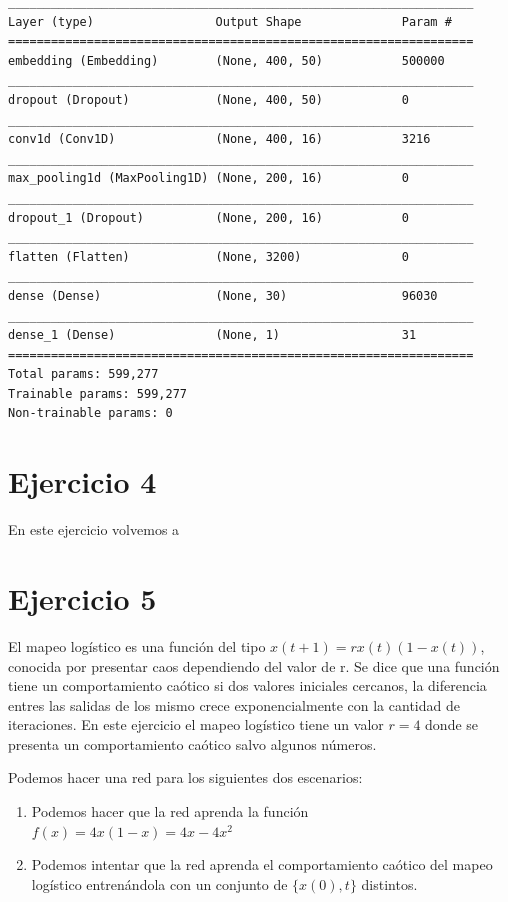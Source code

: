 \begin{verbatim}
_________________________________________________________________
Layer (type)                 Output Shape              Param #   
=================================================================
embedding (Embedding)        (None, 400, 50)           500000    
_________________________________________________________________
dropout (Dropout)            (None, 400, 50)           0         
_________________________________________________________________
conv1d (Conv1D)              (None, 400, 16)           3216      
_________________________________________________________________
max_pooling1d (MaxPooling1D) (None, 200, 16)           0         
_________________________________________________________________
dropout_1 (Dropout)          (None, 200, 16)           0         
_________________________________________________________________
flatten (Flatten)            (None, 3200)              0         
_________________________________________________________________
dense (Dense)                (None, 30)                96030     
_________________________________________________________________
dense_1 (Dense)              (None, 1)                 31        
=================================================================
Total params: 599,277
Trainable params: 599,277
Non-trainable params: 0

\end{verbatim}

\section*{Ejercicio 4}

En este ejercicio volvemos a

\section*{Ejercicio 5}

    El mapeo logístico es una función del tipo $x(t+1) = r x(t)(1-x(t))$, conocida por presentar caos dependiendo del valor de r. Se dice que una función tiene un comportamiento caótico si dos valores iniciales  cercanos, la diferencia entres las salidas de los mismo crece exponencialmente con la cantidad de iteraciones.  En este ejercicio el mapeo logístico tiene un valor $r=4$ donde se presenta un comportamiento caótico salvo algunos números. 

    Podemos hacer una red para los siguientes dos escenarios:
    \begin{enumerate}
        \item Podemos hacer que la red aprenda la función $f(x)= 4x(1-x)=4x-4x^2$
        \item Podemos intentar que la red aprenda el comportamiento caótico del mapeo logístico entrenándola con un conjunto de $\{ x(0), t\}$ distintos.
    \end{enumerate}

